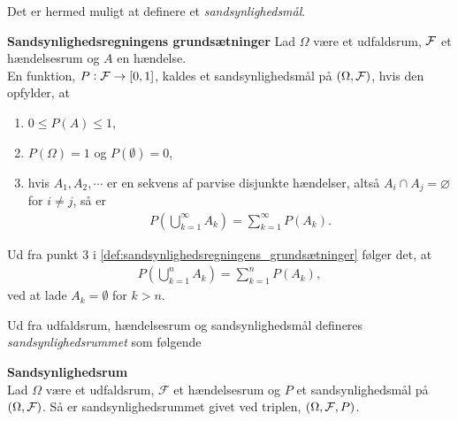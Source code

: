 Det er hermed muligt at definere et \textit{sandsynlighedsmål}.

\begin{defn}\textbf{Sandsynlighedsregningens grundsætninger} \label{def:sandsynlighedsregningens_grundsætninger}%
\newline
Lad $\Omega$ være et udfaldsrum, $\mathcal{F}$ et hændelsesrum og $A$ en hændelse.\\
En funktion, $P: \mathcal{F} \to [0,1]$, kaldes et sandsynlighedsmål på $(\Omega, \mathcal{F})$, hvis den opfylder, at
\begin{enumerate}
    \item $0 \leq P(A) \leq 1$,
    \item $P(\Omega) = 1$ og $P(\emptyset)=0$,
    \item hvis $A_1, A_2, \cdots $ er en sekvens af parvise disjunkte hændelser, altså $A_i \cap A_j = \varnothing$ for $i \neq j$, så er
    \begin{align*}
        P\left(\bigcup_{k=1}^\infty A_k \right) = \sum_{k=1}^\infty P(A_k).
    \end{align*}
\end{enumerate}

\end{defn}
Ud fra punkt 3 i \autoref{def:sandsynlighedsregningens_grundsætninger} følger det, at
\begin{align*}
    P\left(\bigcup_{k=1}^n A_k \right) = \sum_{k=1}^n P(A_k),
\end{align*}
ved at lade $A_k = \emptyset$ for $k > n$.

Ud fra udfaldsrum, hændelsesrum og sandsynlighedsmål defineres \textit{sandsynlighedsrummet} som følgende

\begin{minipage}\textwidth
\begin{defn}\textbf{Sandsynlighedsrum} \label{def:sandsynlighedsrum}\\
    Lad $\Omega$ være et udfaldsrum, $\mathcal{F}$ et hændelsesrum og $P$ et sandsynlighedsmål på $(\Omega, \mathcal{F})$. Så er sandsynlighedsrummet givet ved triplen, $(\Omega, \mathcal{F}, P)$. 
\end{defn}
\end{minipage}



